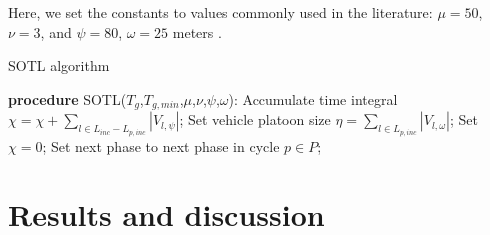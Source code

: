 \documentclass[journal]{IEEEtran}
\begin{document}
Here, we set the constants to values commonly used in the literature: $\mu = 50$, $\nu = 3$, and $\psi = 80$, $\omega = 25$ meters \cite{placzek2014self}. \\

\begin{algorithm}[H]
\caption*{SOTL algorithm}
\begin{algorithmic}
    \STATE \textbf{procedure} SOTL($T_g$,$T_{g,min}$,$\mu$,$\nu$,$\psi$,$\omega$):
    \STATE Accumulate time integral $\chi = \chi + \sum_{l \in L_{inc} - L_{p,inc}} |V_{l,\psi}|$;
        \STATE Set vehicle platoon size $\eta = \sum_{l \in L_{p,inc}} |V_{l,\omega}|$;
            \STATE Set $\chi = 0$;
            \STATE Set next phase to next phase in cycle $p \in P$;
        \ENDIF
    \ENDIF 
\end{algorithmic}
\end{algorithm}

\section{Results and discussion}
\label{sec:results}
\end{document}
